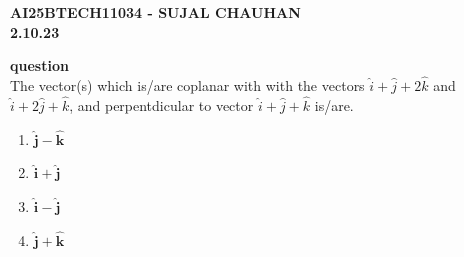 \documentclass[12pt]{article}
\begin{document}
    



\newpage
\begin{center}
\textbf{\Large AI25BTECH11034 - SUJAL CHAUHAN }\\
\textbf {2.10.23}
\end{center}
\textbf{question}\\
The vector(s) which is/are coplanar with with the vectors $\hat{i}+\hat{j}+2\hat{k}$ and $\hat{i}+2\hat{j}+\hat{k}$, and perpentdicular to vector $\hat{i}+\hat{j}+\hat{k}$ is/are.
\begin{enumerate}
    \item $\hat{\mathbf{j}} - \hat{\mathbf{k}}$
    \item $\hat{\mathbf{i}} + \hat{\mathbf{j}}$
    \item $\hat{\mathbf{i}} - \hat{\mathbf{j}}$
    \item $\hat{\mathbf{j}} + \hat{\mathbf{k}}$
\end{enumerate}
\end{document}
